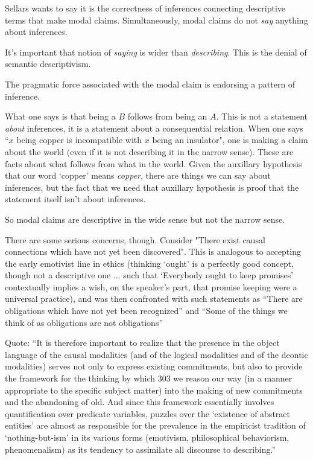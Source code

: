 Sellars wants to say it is the correctness of inferences connecting descriptive terms that make modal claims. Simultaneously, modal claims do not \emph{say} anything about inferences.

It's important that notion of \emph{saying} is wider than \emph{describing}. This is the denial of semantic descriptivism.

The pragmatic force associated with the modal claim is endorsing a pattern of inference.

What one says is that being a $B$ follows from being an $A$. This is not a statement \emph{about} inferences, it is a statement about a consequential relation. When one says ``$x$ being copper is incompatible with $x$ being an insulator", one is making a claim about the world (even if it is not describing it in the narrow sense). These are facts about what follows from what in the world. Given the auxillary hypothesis that our word `copper' means \emph{copper}, there are things we can say about inferences, but the fact that we need that auxillary hypothesis is proof that the statement itself isn't about inferences.

So modal claims are descriptive in the wide sense but not the narrow sense.


There are some serious concerns, though. Consider "There exist causal connections which have not yet been discovered". This is analogous to accepting the early emotivist line in ethics (thinking `ought' is a perfectly good concept, though not a descriptive one ... such that `Everybody ought to keep promises' contextually implies a wish, on the speaker's part, that promise keeping were a universal practice), and was then confronted with such statements as ``There are obligations which have not yet been recognized'' and ``Some of the things we think of as obligations are not obligations''

Quote: ``It is therefore important to realize that the presence in the object language of the causal modalities (and of the logical modalities and of the deontic modalities) serves not only to express existing commitments, but also to provide the framework for the thinking by which {303} we reason our way (in a manner appropriate to the specific subject matter) into the making of new commitments and the abandoning of old. And since this framework essentially involves quantification over predicate variables, puzzles over the `existence of abstract entities' are almost as responsible for the prevalence in the empiricist tradition of `nothing-but-ism' in its various forms (emotivism, philosophical behaviorism, phenomenalism) as its tendency to assimilate all discourse to describing.''

